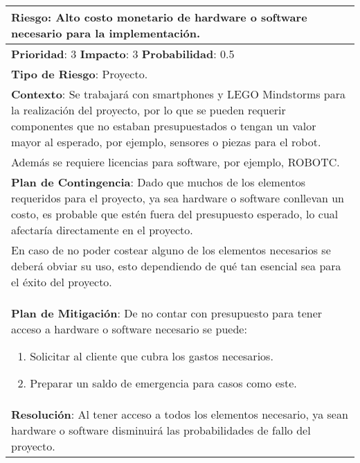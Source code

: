 \begin{table}[H]
  \centering
  \begin{tabular}{|p{15cm}|}\hline
    {\bf Riesgo}: Alto costo monetario de hardware o software necesario para la implementación.\\\hline
    {\bf Prioridad}: 3  {\bf Impacto}: 3  {\bf Probabilidad}: 0.5\\\hline
    {\bf Tipo de Riesgo}: Proyecto.\\\hline
    {\bf Contexto}: Se trabajará con smartphones y LEGO Mindstorms para la realización del proyecto, por lo que se pueden requerir componentes que no estaban presupuestados o tengan un valor mayor  al esperado, por ejemplo, sensores o piezas para el robot.\\Además se requiere licencias para software, por ejemplo, ROBOTC.\\\hline
    {\bf Plan de Contingencia}: Dado que muchos de los elementos requeridos para el proyecto, ya sea hardware o software conllevan un costo, es probable que estén fuera del presupuesto esperado, lo cual afectaría directamente en el proyecto.\\En caso de no poder costear alguno de los elementos necesarios se deberá obviar su uso, esto dependiendo de qué tan esencial sea para el éxito del proyecto.\\\hline
    {\bf Plan de Mitigación}: De no contar con presupuesto para tener acceso a hardware o software necesario se puede:\begin{enumerate}\item Solicitar al cliente que cubra los gastos necesarios.\item Preparar un saldo de emergencia para casos como este.\end{enumerate}\\\hline
    {\bf Resolución}: Al tener acceso a todos los elementos necesario, ya sean hardware o software disminuirá las probabilidades de fallo del proyecto.\\\hline
  \end{tabular}
  \label{table:R8}
\end{table}


